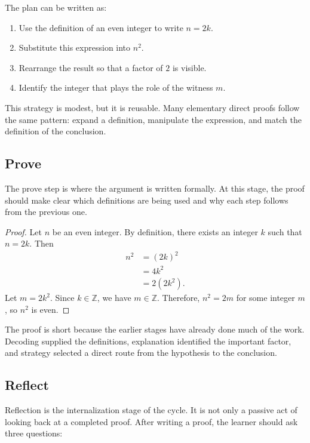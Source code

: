 \documentclass[11pt,a4paper]{article}
\begin{document}
The plan can be written as:

\begin{enumerate}[label=\arabic*., leftmargin=*]
    \item Use the definition of an even integer to write \(n = 2k\).
    \item Substitute this expression into \(n^2\).
    \item Rearrange the result so that a factor of \(2\) is visible.
    \item Identify the integer that plays the role of the witness \(m\).
\end{enumerate}

This strategy is modest, but it is reusable. Many elementary direct proofs follow the same pattern: expand a definition, manipulate the expression, and match the definition of the conclusion.

\subsection{Prove}

The prove step is where the argument is written formally. At this stage, the proof should make clear which definitions are being used and why each step follows from the previous one.

\begin{proof}
Let \(n\) be an even integer. By definition, there exists an integer \(k\) such that \(n = 2k\). Then
\begin{align*}
    n^2 &= (2k)^2 \\
        &= 4k^2 \\
        &= 2(2k^2).
\end{align*}
Let \(m = 2k^2\). Since \(k \in \mathbb{Z}\), we have \(m \in \mathbb{Z}\). Therefore, \(n^2 = 2m\) for some integer \(m\), so \(n^2\) is even.
\end{proof}

The proof is short because the earlier stages have already done much of the work. Decoding supplied the definitions, explanation identified the important factor, and strategy selected a direct route from the hypothesis to the conclusion.

\subsection{Reflect}

Reflection is the internalization stage of the cycle. It is not only a passive act of looking back at a completed proof. After writing a proof, the learner should ask three questions:
\end{document}
